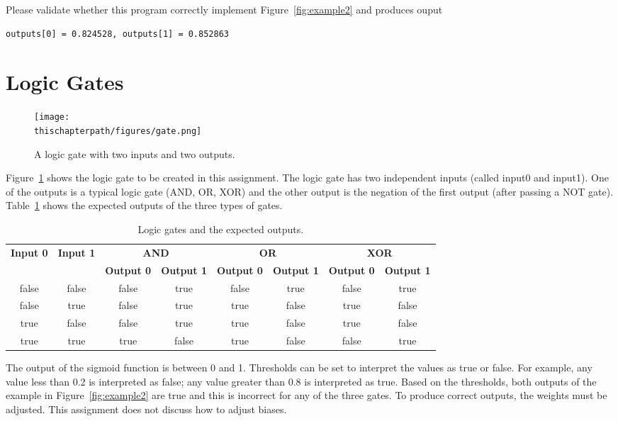 Please validate whether this program correctly implement
Figure~\ref{fig:example2} and produces ouput

\begin{verbatim}
outputs[0] = 0.824528, outputs[1] = 0.852863
\end{verbatim}

\section{Logic Gates}


\begin{figure}[h]
\centering
{\texttt{[image: \\thischapterpath/figures/gate.png]}}
\caption{A logic gate with two inputs and two outputs.}
  \label{fig:gate}
\end{figure}

Figure~\ref{fig:gate} shows the logic gate to be created in this
assignment.  The logic gate has two independent inputs (called input0
and input1).  One of the outputs is a typical logic gate (AND, OR,
XOR) and the other output is the negation of the first output (after
passing a NOT gate).  Table~\ref{table:logicgates} shows the expected
outputs of the three types of gates.

\begin{table}
\begin{tabular}{|c|c||c|c||c|c||c|c||}  \hline
\multirow{2}{*}{\bf Input 0} &
\multirow{2}{*}{\bf Input 1} &
\multicolumn{2}{c||}{\bf AND} &
\multicolumn{2}{c||}{\bf OR} &
\multicolumn{2}{c||}{\bf XOR} \\
& & {\bf Output 0} & {\bf Output 1} &
{\bf Output 0} & {\bf Output 1} &
{\bf Output 0} & {\bf Output 1} \\ \hline

false & false & false & true & false & true & false & true \\ \hline

false & true & false & true & true & false & true & false \\ \hline

true & false & false & true & true & false & true & false \\ \hline

true & true & true & false & true & false & false & true \\ \hline
\end{tabular}
\caption{Logic gates and the expected outputs.}
\label{table:logicgates}
\end{table}

The output of the sigmoid function is between 0 and 1.  Thresholds can
be set to interpret the values as true or false.  For example, any
value less than 0.2 is interpreted as false; any value greater than
0.8 is interpreted as true.  Based on the thresholds, both outputs of
the example in Figure~\ref{fig:example2} are true and this is
incorrect for any of the three gates.  To produce correct outputs, the
weights must be adjusted.  This assignment does not discuss how to
adjust biases.

